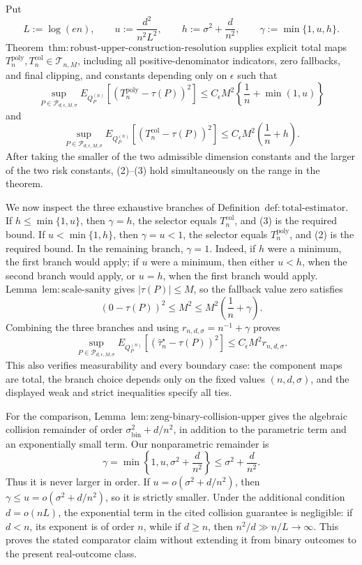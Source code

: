 Put
\[
 L:=\log(en),\qquad
 u:=\frac{d^2}{n^2L^2},\qquad
 h:=\sigma^2+\frac d{n^2},
 \qquad \gamma:=\min\{1,u,h\}.
\tag{1}
\]
Theorem~\(\mathrm{thm:robust\text{-}upper\text{-}construction\text{-}resolution}\) supplies explicit total maps \(T_n^{\mathrm{poly}},T_n^{\mathrm{col}}\in\mathcal T_{n,M}\), including all positive-denominator indicators, zero fallbacks, and final clipping, and constants depending only on \(\epsilon\) such that
\[
 \sup_{P\in\mathcal P_{d,\epsilon,M,\sigma}}
 E_{Q_P^{(n)}}[(T_n^{\mathrm{poly}}-\tau(P))^2]
 \le C_\epsilon M^2\left\{\frac1n+\min(1,u)\right\}
\tag{2}
\]
and
\[
 \sup_{P\in\mathcal P_{d,\epsilon,M,\sigma}}
 E_{Q_P^{(n)}}[(T_n^{\mathrm{col}}-\tau(P))^2]
 \le C_\epsilon M^2\left(\frac1n+h\right).
\tag{3}
\]
After taking the smaller of the two admissible dimension constants and the larger of the two risk constants, (2)--(3) hold simultaneously on the range in the theorem.

We now inspect the three exhaustive branches of Definition~\(\mathrm{def:total\text{-}estimator}\).  If \(h\le\min\{1,u\}\), then \(\gamma=h\), the selector equals \(T_n^{\mathrm{col}}\), and (3) is the required bound.  If \(u<\min\{1,h\}\), then \(\gamma=u<1\), the selector equals \(T_n^{\mathrm{poly}}\), and (2) is the required bound.  In the remaining branch, \(\gamma=1\).  Indeed, if \(h\) were a minimum, the first branch would apply; if \(u\) were a minimum, then either \(u<h\), when the second branch would apply, or \(u=h\), when the first branch would apply.  Lemma~\(\mathrm{lem:scale\text{-}sanity}\) gives \(|\tau(P)|\le M\), so the fallback value zero satisfies
\[
 (0-\tau(P))^2\le M^2\le M^2\left(\frac1n+\gamma\right).
\tag{4}
\]
Combining the three branches and using \(r_{n,d,\sigma}=n^{-1}+\gamma\) proves
\[
 \sup_{P\in\mathcal P_{d,\epsilon,M,\sigma}}
 E_{Q_P^{(n)}}[(\widehat\tau_n^\star-\tau(P))^2]
 \le C_\epsilon M^2r_{n,d,\sigma}.
\tag{5}
\]
This also verifies measurability and every boundary case: the component maps are total, the branch choice depends only on the fixed values \((n,d,\sigma)\), and the displayed weak and strict inequalities specify all ties.

For the comparison, Lemma~\(\mathrm{lem:zeng\text{-}binary\text{-}collision\text{-}upper}\) gives the algebraic collision remainder of order \(\sigma_{\mathrm{bin}}^2+d/n^2\), in addition to the parametric term and an exponentially small term.  Our nonparametric remainder is
\[
 \gamma=\min\left\{1,u,\sigma^2+\frac d{n^2}\right\}
 \le \sigma^2+\frac d{n^2}.
\tag{6}
\]
Thus it is never larger in order.  If \(u=o(\sigma^2+d/n^2)\), then \(\gamma\le u=o(\sigma^2+d/n^2)\), so it is strictly smaller.  Under the additional condition \(d=o(nL)\), the exponential term in the cited collision guarantee is negligible: if \(d<n\), its exponent is of order \(n\), while if \(d\ge n\), then \(n^2/d\gg n/L\to\infty\).  This proves the stated comparator claim without extending it from binary outcomes to the present real-outcome class.